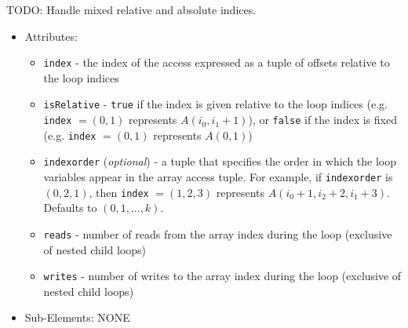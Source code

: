 \documentclass{article}
\begin{document}
  TODO: Handle mixed relative and absolute indices.

  \begin{itemize}
    \item Attributes:
    \begin{itemize}
      \item {\tt index} - the index of the access expressed as a tuple
        of offsets relative to the loop indices
      \item {\tt isRelative} - {\tt true} if the index is given relative
        to the loop indices (e.g. {\tt index} $=(0, 1)$ represents $A(i_0,
        i_1 + 1)$), or {\tt false} if the index is fixed (e.g. {\tt index}
        $=(0, 1)$ represents $A(0, 1)$)
      \item {\tt indexorder} ({\it optional}) - a tuple that specifies
        the order in which the loop variables appear in the array access
        tuple.  For example, if {\tt indexorder} is $(0, 2, 1)$, then
        {\tt index} $=(1, 2, 3)$ represents $A(i_0+1, i_2+2, i_1+3)$.
        Defaults to $(0, 1, ..., k)$.
      \item {\tt reads} - number of reads from the array index during
        the loop (exclusive of nested child loops)
      \item {\tt writes} - number of writes to the array index during
        the loop (exclusive of nested child loops)
    \end{itemize}
    \item Sub-Elements: NONE
  \end{itemize}
\end{document}
